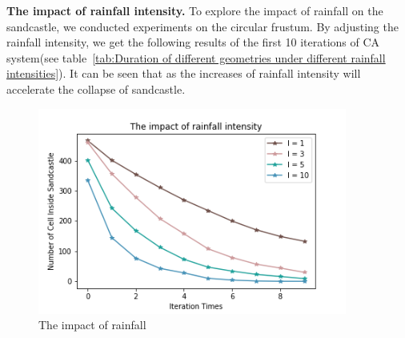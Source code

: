 \documentclass{mcmthesis}		    %
\begin{document}
    
    
    
     \textbf{The impact of rainfall intensity. }To explore the impact of rainfall on the sandcastle, we conducted experiments on the circular frustum. By adjusting the rainfall intensity, we get the following results of the first 10 iterations of CA system(see table~\ref{tab:Duration of different geometries under different rainfall intensities}). It can be seen that as the increases of rainfall intensity will accelerate the collapse of sandcastle. 
    \begin{figure}[htbp!]
        \centering
        \includegraphics[width=4in]{The impact of rainfall intensity.png}
        \caption{The impact of rainfall}
        \label{fig:the impact of rainfall}
    \end{figure}
    
\end{document}

